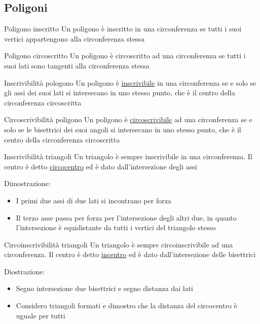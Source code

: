 \subsection{Poligoni}
\begin{definizione}{Poligono inscritto}
	Un poligono è inscritto in una circonferenza se tutti i suoi vertici appartengono alla circonferenza stessa
\end{definizione}
\begin{definizione}{Poligono circoscritto}
	Un poligono è circoscritto ad una circonferenza se tutti i suoi lati sono tangenti alla circonferenza stessa
\end{definizione}
\begin{teorema}{Inscrivibilità pologono}
	Un poligono è \underline{inscrivibile} in una circonferenza se e solo se gli assi dei suoi lati si intersecano in uno stesso punto, che è il centro della circonferenza circoscritta
\end{teorema}
\begin{teorema}{Circoscrivibilità poligono}
	Un poligono è \underline{circoscrivibile} ad una circonferenza se e solo se le bisettrici dei suoi angoli si intersecano in uno stesso punto, che è il centro della circonferenza circoscritta
\end{teorema}

\begin{teorema}{Inscrivibilità triangoli}
	Un triangolo è sempre inscrivibile in una circonferenza. Il centro è detto \underline{circocentro} ed è dato dall'intersezione degli assi
\end{teorema}\label{inscrivibilità triangoli}
Dimostrazione:
\begin{itemize}
	\item I primi due assi di due lati si incontrano per forza
	\item Il terzo asse passa per forza per l'intersezione degli altri due, in quanto l'intersezione è equidistante da tutti i vertici del triangolo stesso
\end{itemize}

\begin{teorema}{Circoinscrivibilità triangoli}
	Un triangolo è sempre circoinscrivibile ad una circonferenza. Il centro è detto \underline{incentro} ed è dato dall'intersezione delle bisettrici
\end{teorema}
Diostrazione:
\begin{itemize}
	\item Segno intersezione due bisettrici e segno distanza dai lati
	\item Considero triangoli formati e dimostro che la distanza del circocentro è uguale per tutti
\end{itemize}

